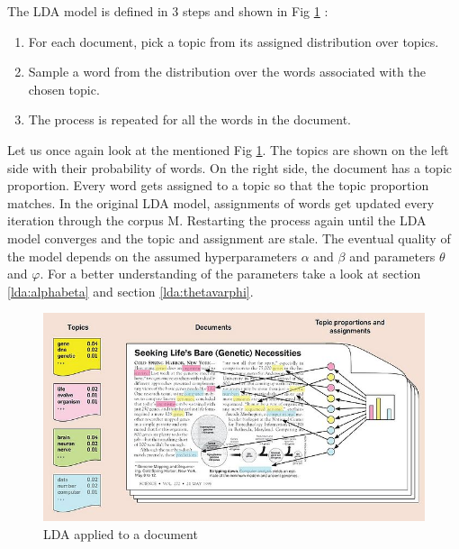 The LDA model is defined in 3 steps and shown in Fig \ref{fig:LDA_example} :
\begin{enumerate}
    \item For each document, pick a topic from its assigned distribution over topics.
    \item Sample a word from the distribution over the words associated with the chosen topic. 
    \item  The process is repeated for all the words in the document.
\end{enumerate}

Let us once again look at the mentioned Fig \ref{fig:LDA_example}. The topics are shown on the left side with their probability of words. On the right side, the document has a topic proportion. Every word gets assigned to a topic so that the topic proportion matches.  
In the original LDA model, assignments of words get updated every iteration through the corpus M. Restarting the process again until the LDA model converges and the topic and assignment are stale. The eventual quality of the model depends on the assumed hyperparameters $\alpha$ and $\beta$ and parameters $\theta$ and $\varphi$. For a better understanding of the parameters take a look at section \ref{lda:alphabeta} and section \ref{lda:thetavarphi}.

\begin{figure}
    \centering
    \includegraphics[scale=0.6]{methodology/700px-Illustrating_LDA.jpg}
    \caption{LDA applied to a document}
    \label{fig:LDA_example}
\end{figure}

